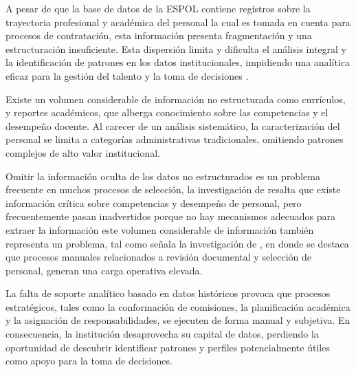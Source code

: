         A pesar de que la base de datos de la ESPOL contiene registros sobre la trayectoria profesional y académica del personal la cual es tomada en cuenta para procesos de contratación, esta información presenta fragmentación y una estructuración insuficiente. Esta dispersión limita y dificulta el análisis integral y la identificación de patrones en los datos institucionales, impidiendo una analítica eficaz para la gestión del talento y la toma de decisiones \parencite{Karwehl2021}.
        
        Existe un volumen considerable de información no estructurada como currículos, y reportes académicos, que alberga conocimiento sobre las competencias y el desempeño docente. Al carecer de un análisis sistemático, la caracterización del personal se limita a categorías administrativas tradicionales, omitiendo patrones complejos de alto valor institucional. 

        Omitir la información oculta de los datos no estructurados es un problema frecuente en muchos procesos de selección, la investigación de \textcite{Asfahani2024} resalta que existe información crítica sobre competencias y desempeño de personal, pero frecuentemente pasan inadvertidos porque no hay mecanismos adecuados para extraer la información este volumen considerable de información también representa un problema, tal como señala la investigación de \textcite{Horodyski2023}, en donde se destaca que procesos manuales relacionados a revisión documental y selección de personal, generan una carga operativa elevada.

        La falta de soporte analítico basado en datos históricos provoca que procesos estratégicos, tales como la conformación de comisiones, la planificación académica y la asignación de responsabilidades, se ejecuten de forma manual y subjetiva. En consecuencia, la institución desaprovecha su capital de datos, perdiendo la oportunidad de descubrir identificar patrones y perfiles potencialmente útiles como apoyo para la toma de decisiones. 

    
    
